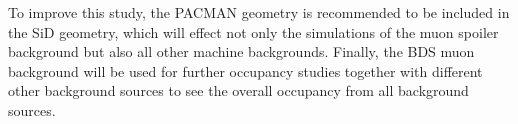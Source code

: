 To improve this study, the PACMAN geometry is recommended to be included in the SiD geometry, which will effect not only the simulations of the muon spoiler background but also all other machine backgrounds.
Finally, the BDS muon background will be used for further occupancy studies together with different other background sources to see the overall occupancy from all background sources.